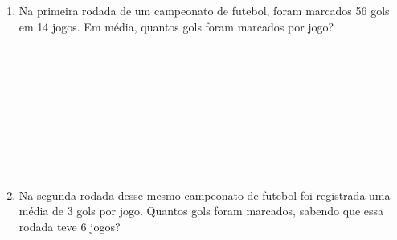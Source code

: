 \documentclass[a4paper,14pt]{article}
\begin{document}
\begin{enumerate}
		\item Na primeira rodada de um campeonato de futebol, foram marcados 56 gols em 14 jogos. Em média, quantos gols foram marcados por jogo?  \\\\\\\\\\\\\\\\\\\\
		\item Na segunda rodada desse mesmo campeonato de futebol foi registrada uma média de 3 gols por jogo. Quantos gols foram marcados, sabendo que essa rodada teve 6 jogos?  \\\\\\\\\\\\\\\\\\\\
	\end{enumerate}
\end{document}
